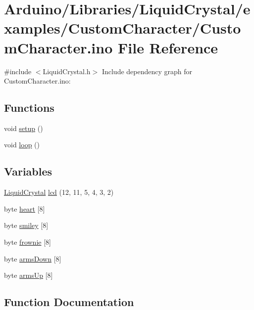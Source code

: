 \hypertarget{_custom_character_8ino}{}\section{Arduino/\+Libraries/\+Liquid\+Crystal/examples/\+Custom\+Character/\+Custom\+Character.ino File Reference}
\label{_custom_character_8ino}
{\ttfamily \#include $<$Liquid\+Crystal.\+h$>$}\newline
Include dependency graph for Custom\+Character.\+ino\+:
\subsection*{Functions}
\begin{DoxyCompactItemize}
\item 
void \hyperlink{_custom_character_8ino_a4fc01d736fe50cf5b977f755b675f11d}{setup} ()
\item 
void \hyperlink{_custom_character_8ino_afe461d27b9c48d5921c00d521181f12f}{loop} ()
\end{DoxyCompactItemize}
\subsection*{Variables}
\begin{DoxyCompactItemize}
\item 
\hyperlink{class_liquid_crystal}{Liquid\+Crystal} \hyperlink{_custom_character_8ino_a7226623e632d4109904c86009c9f3b60}{lcd} (12, 11, 5, 4, 3, 2)
\item 
byte \hyperlink{_custom_character_8ino_a60aa6865d4e8dab6d4142ca2ac525ce6}{heart} \mbox{[}8\mbox{]}
\item 
byte \hyperlink{_custom_character_8ino_a276fa84b8570a88f4c9fa4b8700316e8}{smiley} \mbox{[}8\mbox{]}
\item 
byte \hyperlink{_custom_character_8ino_a5e04029abaae9241644e7b46184851f9}{frownie} \mbox{[}8\mbox{]}
\item 
byte \hyperlink{_custom_character_8ino_a84e32ed8c9414991e34d7ce623015000}{arms\+Down} \mbox{[}8\mbox{]}
\item 
byte \hyperlink{_custom_character_8ino_a4acb3cd9e40f28787bd8fbc207db06a3}{arms\+Up} \mbox{[}8\mbox{]}
\end{DoxyCompactItemize}


\subsection{Function Documentation}
\mbox{\label{_custom_character_8ino_afe461d27b9c48d5921c00d521181f12f}} 
